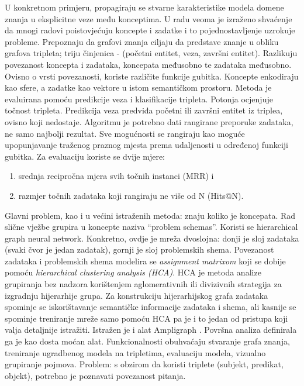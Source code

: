 U konkretnom primjeru, propagiraju se stvarne karakteristike modela domene znanja u eksplicitne veze među konceptima.\newline
\newline
U radu \citep{15} veoma je izraženo shvaćenje da mnogi radovi poistovjećuju koncepte i zadatke i to pojednostavljenje uzrokuje probleme.\newline
Prepoznaju da grafovi znanja ciljaju da predstave znanje u obliku grafova tripleta; triju činjenica - (početni entitet, veza, završni entitet).\newline
Razlikuju povezanost koncepta i zadataka, koncepata međusobno te zadataka međusobno. Ovisno o vrsti povezanosti, koriste različite funkcije gubitka.\newline
Koncepte enkodiraju kao sfere, a zadatke kao vektore u istom semantičkom prostoru.\newline
Metoda je evaluirana pomoću predikcije veza i klasifikacije tripleta. Potonja ocjenjuje točnost tripleta.
Predikcija veza predviđa početni ili završni entitet iz triplea, ovisno koji nedostaje. Algoritmu je potrebno dati rangirane preporuke zadataka, ne samo najbolji rezultat.
Sve mogućnosti se rangiraju kao moguće upopunjavanje traženog praznog mjesta prema udaljenosti u određenoj funkciji gubitka. Za evaluaciju koriste se dvije mjere:
\begin{enumerate}
\item srednja recipročna mjera svih točnih instanci (MRR) i
\item razmjer točnih zadataka koji rangiraju ne više od N (Hits@N).
\end{enumerate}
Glavni problem, kao i u većini istraženih metoda: znaju koliko je koncepata.\newline
\newline
Rad \citep{16} slične vježbe grupira u koncepte naziva “problem schemas”. Koristi se hierarchical graph neural network. Konkretno, ovdje je mreža dvoslojna: donji je sloj zadataka (svaki čvor je jedan zadatak), gornji je sloj problemskih shema. Povezanost zadataka i problemskih shema modelira se \textit{assignment matrixom} koji se dobije pomoću \textit{hierarchical clustering analysis (HCA)}. HCA je metoda analize grupiranja bez nadzora korištenjem aglomerativnih ili divizivnih strategija za izgradnju hijerarhije grupa.
Za konstrukciju hijerarhijskog grafa zadataka spominje se iskorištavanje semantičke informacije zadataka i shema, ali kasnije se  spominje treniranje mreže samo pomoću HCA pa je i to jedan od pristupa koji valja detaljnije istražiti.\newline
\newline
Istražen je i alat Ampligraph \citep{17, 18}. Površna analiza definirala ga je kao dosta moćan alat. Funkcionalnosti obuhvaćaju stvaranje grafa znanja, treniranje ugradbenog modela na tripletima, evaluaciju modela, vizualno grupiranje pojmova.
Problem: s obzirom da koristi triplete (subjekt, predikat, objekt), potrebno je poznavati povezanost pitanja.